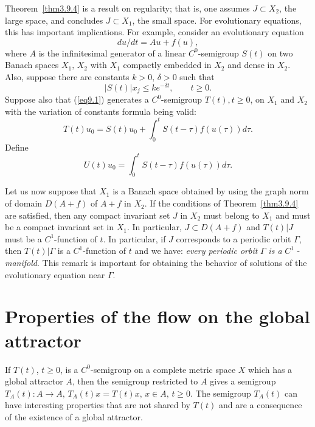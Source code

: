 \documentclass{surv-l}
\theoremstyle{plain}
\theoremstyle{definition}
\numberwithin{equation}{section}
\numberwithin{figure}{chapter}
\begin{document}
Theorem~\ref{thm3.9.4} is a result on regularity; that is, one assumes $J\subset X_{2}$, the large space, and concludes $J\subset X_{1}$, the small space. For evolutionary equations, this has important implications. For example, consider an evolutionary equation
\begin{equation}\label{eq9.1}
du/dt=Au+f(u),
\end{equation}
where $A$ is the infinitesimal generator of a linear $C^{0}$-semigroup $S(t)$ on two Banach spaces $X_{1},\, X_{2}$ with $X_{1}$ compactly embedded in $X_{2}$ and dense in $X_{2}$. Also, suppose there are constants $k>0,\, \delta>0$ such that
\begin{equation}\label{eq9.2}
|S(t)|x_{j}\leq ke^{-\delta t},\qquad t\geq 0.
\end{equation}
Suppose also that (\ref{eq9.1}) generates a $C^{0}$-semigroup $T(t),t\geq 0$, on $X_{1}$ and $X_{2}$ with the variation of constants formula being valid:
\begin{equation*}
 T(t)u_{0}=S(t)u_{0}+\int_{0}^{t}S(t-\tau)f(u(\tau))d\tau.
\end{equation*}
Define
\begin{equation*}
 U(t)u_{0}=\int_{0}^{t}S(t-\tau)f(u(\tau))d\tau.
\end{equation*}

Let us now suppose that $X_{1}$ is a Banach space obtained by using the graph norm of domain $D(A+f)$ of $A+f$ in $X_{2}$. If the conditions of Theorem~\ref{thm3.9.4} are satisfied, then any compact invariant set $J$ in $X_{2}$ must belong to $X_{1}$ and must be a compact invariant set in $X_{1}$. In particular, $J\subset D(A+f)$ and $T(t)|J$ must be a $C^{1}$-function of $t$. In particular, if $J$ corresponds to a periodic orbit $\Gamma$, then $ T(t)|\Gamma$ is a $C^{1}$-function of $t$ and we have: \emph{every periodic orbit} $\Gamma$ \emph{is a} $C^{1}$ -\emph{manifold}. This remark is important for obtaining the behavior of solutions of the evolutionary equation near $\Gamma$.


\section{Properties of the flow on the global attractor}\label{sec3.10}

If $T(t)$, $t\geq 0$, is a $C^{0}$-semigroup on a complete metric space $X$ which has a global attractor $A$, then the semigroup restricted to $A$ gives a semigroup $T_{A}(t)\!:A\rightarrow A,\, T_{A}(t)x=T(t)x,\, x\in A,\, t\geq 0$. The semigroup $T_{A}(t)$ can have interesting properties that are not shared by $T(t)$ and are a consequence of the existence of a global attractor.
\end{document}
